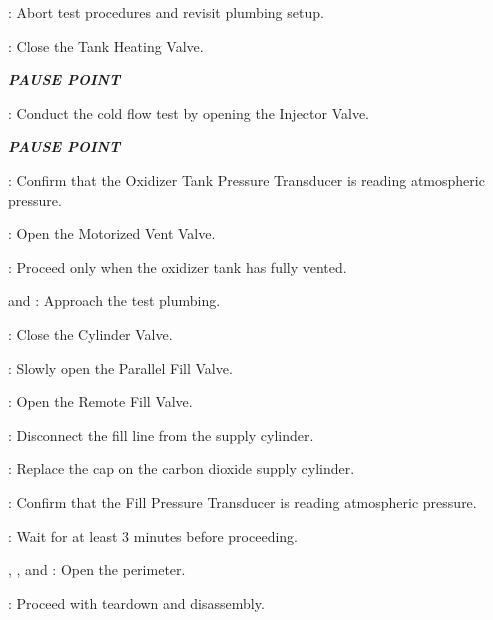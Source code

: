 \begin{checklist}
\begin{checklist}[label=$\bullet$]
\begin{checklist}
            \item \ops{}: Abort test procedures and revisit plumbing setup.
        \end{checklist}
    \end{checklist}
    \item \heat: Close the Tank Heating Valve.
    \item \textbf{\textit{PAUSE POINT}}
    \item \primary{}: Conduct the cold flow test by opening the Injector Valve.
    \item \textbf{\textit{PAUSE POINT}}
    \item \daq{}: Confirm that the Oxidizer Tank Pressure Transducer is reading atmospheric pressure.
    \item \control{}: Open the Motorized Vent Valve.
    \item \ops{}: Proceed only when the oxidizer tank has fully vented.
    \item \primary{} and \secondary: Approach the test plumbing.
    \item \primary{}: Close the Cylinder Valve.
    \item \primary{}: Slowly open the Parallel Fill Valve.
    \item \control{}: Open the Remote Fill Valve.
    \item \primary{}: Disconnect the fill line from the supply cylinder.
    \item \primary{}: Replace the cap on the carbon dioxide supply cylinder.
    \item \daq{}: Confirm that the Fill Pressure Transducer is reading atmospheric pressure.
    \item \ops{}: Wait for at least 3 minutes before proceeding.
    \item \peri{}, \perii{}, and \periii{}: Open the perimeter.
    \item \ops{}: Proceed with teardown and disassembly.
\end{checklist}

